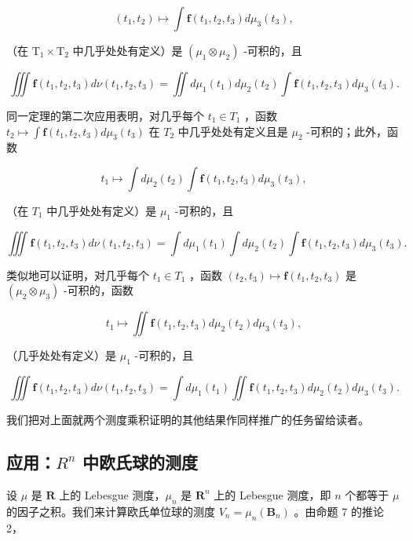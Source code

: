 \[
(t _ {1}, t _ {2}) \mapsto \int \mathbf {f} (t _ {1}, t _ {2}, t _ {3}) d \mu_ {3} (t _ {3}),
\]

（在 \(\mathrm{T}_1\times \mathrm{T}_2\) 中几乎处处有定义）是 \((\mu_{1}\otimes \mu_{2})\) -可积的，且

\[
\iiint \mathbf {f} (t _ {1}, t _ {2}, t _ {3}) d \nu (t _ {1}, t _ {2}, t _ {3}) = \iint d \mu_ {1} (t _ {1}) d \mu_ {2} (t _ {2}) \int \mathbf {f} (t _ {1}, t _ {2}, t _ {3}) d \mu_ {3} (t _ {3}).
\]

同一定理的第二次应用表明，对几乎每个 \(t_{1} \in T_{1}\) ，函数 \(t_{2} \mapsto \int \mathbf{f}(t_{1}, t_{2}, t_{3}) d\mu_{3}(t_{3})\) 在 \(T_{2}\) 中几乎处处有定义且是 \(\mu_{2}\) -可积的；此外，函数

\[
t _ {1} \mapsto \int d \mu_ {2} (t _ {2}) \int \mathbf {f} (t _ {1}, t _ {2}, t _ {3}) d \mu_ {3} (t _ {3}),
\]

（在 \(T_{1}\) 中几乎处处有定义）是 \(\mu_{1}\) -可积的，且

\[
\iiint \mathbf {f} (t _ {1}, t _ {2}, t _ {3}) d \nu (t _ {1}, t _ {2}, t _ {3}) = \int d \mu_ {1} (t _ {1}) \int d \mu_ {2} (t _ {2}) \int \mathbf {f} (t _ {1}, t _ {2}, t _ {3}) d \mu_ {3} (t _ {3}).
\]

类似地可以证明，对几乎每个 \(t_{1} \in T_{1}\) ，函数 \((t_{2}, t_{3}) \mapsto \mathbf{f}(t_{1}, t_{2}, t_{3})\) 是 \((\mu_{2} \otimes \mu_{3})\) -可积的，函数

\[
t _ {1} \mapsto \iint \mathbf {f} (t _ {1}, t _ {2}, t _ {3}) d \mu_ {2} (t _ {2}) d \mu_ {3} (t _ {3}),
\]

（几乎处处有定义）是 \(\mu_{1}\) -可积的，且

\[
\iiint \mathbf {f} (t _ {1}, t _ {2}, t _ {3}) d \nu (t _ {1}, t _ {2}, t _ {3}) = \int d \mu_ {1} (t _ {1}) \iint \mathbf {f} (t _ {1}, t _ {2}, t _ {3}) d \mu_ {2} (t _ {2}) d \mu_ {3} (t _ {3}).
\]

我们把对上面就两个测度乘积证明的其他结果作同样推广的任务留给读者。

\subsection{\texorpdfstring{应用：\(R^{n}\) 中欧氏球的测度}{应用：R to the n 中欧氏球的测度}}

设 \(\mu\) 是 \(\mathbf{R}\) 上的 Lebesgue 测度，\(\mu_n\) 是 \(\mathbf{R}^n\) 上的 Lebesgue 测度，即 \(n\) 个都等于 \(\mu\) 的因子之积。我们来计算欧氏单位球的测度 \(V_n = \mu_n(\mathbf{B}_n)\) 。由命题 7 的推论 2，

